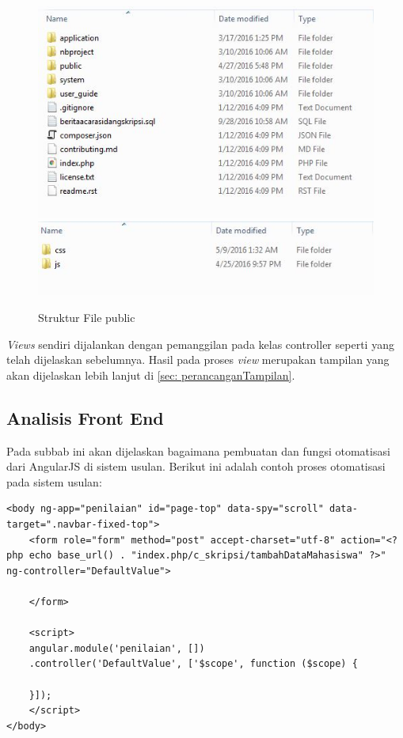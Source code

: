 	\begin{figure}[H]
		\centering
		\includegraphics[scale=0.75]{Gambar/strukturFile}
		\includegraphics[scale=0.75]{Gambar/strukturFilePublic}
		\caption{Struktur File public}
		\label{fig:public}
	\end{figure}
	
	\textit{Views} sendiri dijalankan dengan pemanggilan pada kelas controller seperti yang telah dijelaskan sebelumnya. Hasil pada proses \textit{view} merupakan tampilan yang akan dijelaskan lebih lanjut di \ref{sec: perancanganTampilan}.
	
	\subsection{Analisis Front End}
	\label{sub: frontEnd}
	
	Pada subbab ini akan dijelaskan bagaimana pembuatan dan fungsi otomatisasi dari AngularJS di sistem usulan. Berikut ini adalah contoh proses otomatisasi pada sistem usulan:
	
\begin{lstlisting}
<body ng-app="penilaian" id="page-top" data-spy="scroll" data-target=".navbar-fixed-top">
	<form role="form" method="post" accept-charset="utf-8" action="<?php echo base_url() . "index.php/c_skripsi/tambahDataMahasiswa" ?>" ng-controller="DefaultValue">
	
	</form>
	
	<script>
	angular.module('penilaian', [])
	.controller('DefaultValue', ['$scope', function ($scope) {
	
	}]);
	</script>
</body>
\end{lstlisting}
	
